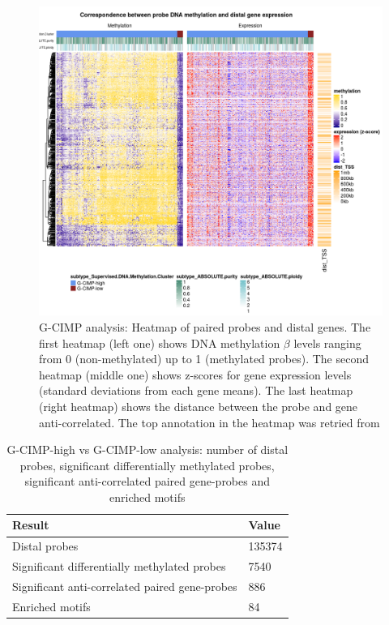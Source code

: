 \begin{center}
\begin{figure}[h!]

\includegraphics[width=16cm]{images/gcimp_heatmap.png}
\caption[G-CIMP analysis: Heatmap of paired probes and distal genes]{\label{fig:gcimpheatmap}G-CIMP analysis:
Heatmap of paired probes and distal genes. The first heatmap (left one) shows DNA methylation $\beta$ levels ranging from 0 (non-methylated) up to 1 (methylated probes).
The second heatmap (middle one) shows z-scores for gene expression levels (standard deviations from each gene means). The last heatmap (right heatmap) shows the distance between the probe
and gene anti-correlated. The top annotation in the heatmap was retried from }
\end{figure}

\end{center}

\begin{table}[h!]
\centering
\caption[G-CIMP analysis: Summary results]{G-CIMP-high vs G-CIMP-low analysis:
number of distal probes, significant differentially methylated probes,
significant anti-correlated paired gene-probes and enriched motifs}
\label{gcimp.summary.results}
\begin{tabular}{@{}ll@{}}
\toprule
Result      & Value \\ \midrule
Distal probes       & 135374 \\
Significant differentially methylated probes & 7540               \\
Significant anti-correlated paired gene-probes  & 886 \\
Enriched motifs & 84
\end{tabular}
\end{table}

